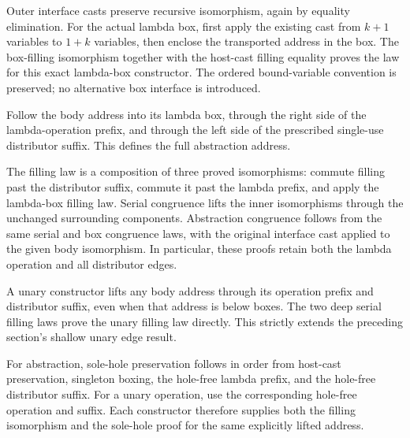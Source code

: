 



Outer interface casts preserve recursive isomorphism, again by equality
elimination. For the actual lambda box, first apply the existing cast from
$k+1$ variables to $1+k$ variables, then enclose the transported address in
the box. The box-filling isomorphism together with the host-cast filling
equality proves the law for this exact lambda-box constructor. The ordered
bound-variable convention is preserved; no alternative box interface is
introduced.







Follow the body address into its lambda box, through the right side of the
lambda-operation prefix, and through the left side of the prescribed
single-use distributor suffix. This defines the full abstraction address.

The filling law is a composition of three proved isomorphisms: commute filling
past the distributor suffix, commute it past the lambda prefix, and apply
the lambda-box filling law. Serial congruence lifts the inner isomorphisms
through the unchanged surrounding components. Abstraction congruence follows
from the same serial and box congruence laws, with the original interface
cast applied to the given body isomorphism. In particular, these proofs
retain both the lambda operation and all distributor edges.







A unary constructor lifts any body address through its operation prefix and
distributor suffix, even when that address is below boxes. The two deep serial
filling laws prove the unary filling law directly. This strictly extends the
preceding section's shallow unary edge result.

For abstraction, sole-hole preservation follows in order from host-cast
preservation, singleton boxing, the hole-free lambda prefix, and the hole-free
distributor suffix. For a unary operation, use the corresponding hole-free
operation and suffix. Each constructor therefore supplies both the filling
isomorphism and the sole-hole proof for the same explicitly lifted address.

